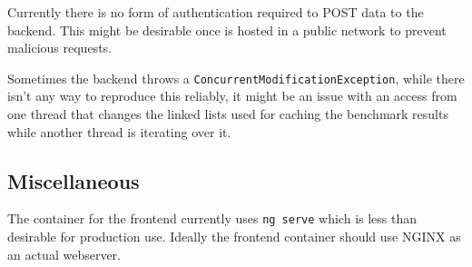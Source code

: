 {Currently there is no form of authentication required to POST data to the backend. This might be desirable once \parkview{} is hosted in a public network to prevent malicious requests.}

{Sometimes the backend throws a \texttt{ConcurrentModificationException}, while there isn't any way to reproduce this reliably, it might be an issue with an access from one thread that changes the linked lists used for caching the benchmark results while another thread is iterating over it.}

\subsection{Miscellaneous}

{The container for the frontend currently uses \texttt{ng serve} which is less than desirable for production use. Ideally the frontend container should use NGINX as an actual webserver.}
